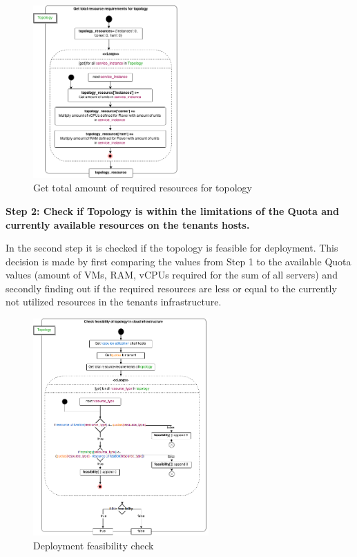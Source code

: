 \begin{figure}[H]
\centering

\includegraphics[width=0.5\textwidth]{images/implementation/cm_get_topology_requirements}

\caption{Get total amount of required resources for topology}
\end{figure}

\textbf{Step 2: Check if Topology is within the limitations of the Quota and currently available resources on the tenants hosts.}

In the second step it is checked if the topology is feasible for deployment. This decision is made by first comparing the values from Step 1 to the available Quota values (amount of VMs, RAM, vCPUs required for the sum of all servers) and secondly finding out if the required resources are less or equal to the currently not utilized resources in the tenants infrastructure.

\begin{figure}[H]
\centering

\includegraphics[width=0.6\textwidth]{images/implementation/cm_feasibility_check}

\caption{Deployment feasibility check}
\end{figure}

